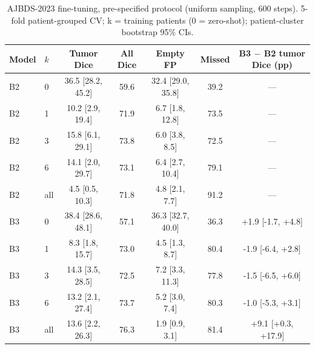 \begin{table}[!ht]
\centering
\scriptsize
\caption{AJBDS-2023 fine-tuning, pre-specified protocol (uniform sampling, 600 steps). 5-fold patient-grouped CV; k = training patients (0 = zero-shot); patient-cluster bootstrap 95\% CIs.}
\label{tab:s-ft}
\begin{tabular}{llccccc}
\toprule
Model & $k$ & Tumor Dice & All Dice & Empty FP & Missed & B3 $-$ B2 tumor Dice (pp) \\
\midrule
B2 & 0 & 36.5 [28.2, 45.2] & 59.6 & 32.4 [29.0, 35.8] & 39.2 & --- \\
B2 & 1 & 10.2 [2.9, 19.4] & 71.9 & 6.7 [1.8, 12.8] & 73.5 & --- \\
B2 & 3 & 15.8 [6.1, 29.1] & 73.8 & 6.0 [3.8, 8.5] & 72.5 & --- \\
B2 & 6 & 14.1 [2.0, 29.7] & 73.1 & 6.4 [2.7, 10.4] & 79.1 & --- \\
B2 & all & 4.5 [0.5, 10.3] & 71.8 & 4.8 [2.1, 7.7] & 91.2 & --- \\
B3 & 0 & 38.4 [28.6, 48.1] & 57.1 & 36.3 [32.7, 40.0] & 36.3 & +1.9 [-1.7, +4.8] \\
B3 & 1 & 8.3 [1.8, 15.7] & 73.0 & 4.5 [1.3, 8.7] & 80.4 & -1.9 [-6.4, +2.8] \\
B3 & 3 & 14.3 [3.5, 28.5] & 72.5 & 7.2 [3.3, 11.3] & 77.8 & -1.5 [-6.5, +6.0] \\
B3 & 6 & 13.2 [2.1, 27.4] & 73.7 & 5.2 [3.0, 7.4] & 80.3 & -1.0 [-5.3, +3.1] \\
B3 & all & 13.6 [2.2, 26.3] & 76.3 & 1.9 [0.9, 3.1] & 81.4 & +9.1 [+0.3, +17.9] \\
\bottomrule
\end{tabular}
\end{table}

